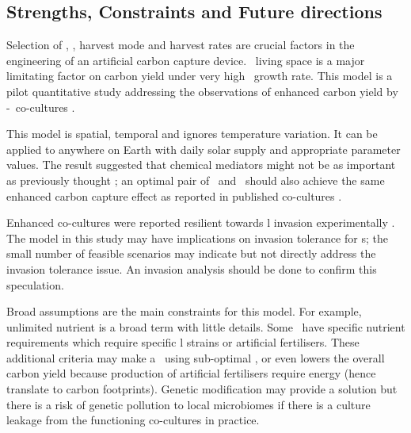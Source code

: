 \documentclass[../thesis.tex]{subfiles} %
\begin{document}
\subsection{Strengths, Constraints and Future directions}
Selection of \phy, \bac, harvest mode and harvest rates are crucial factors in the engineering of an artificial carbon capture device.  \Phy\ living space is a major limitating factor on carbon yield under very high \phy\ growth rate.  This model is a pilot quantitative study addressing the observations of enhanced carbon yield by \phy-\bac\ co-cultures \autocite{fuentes2016impact,santos2014microalgal}.

This model is spatial, temporal and ignores temperature variation.  It can be applied to anywhere on Earth with daily solar supply and appropriate parameter values.  The result suggested that chemical mediators might not be as important as previously thought \autocite{fuentes2016impact}; an optimal pair of \phy\ and \bac\ should also achieve the same enhanced carbon capture effect as reported in published co-cultures \autocite{amin2009photolysis,rivas2010interactions,seyedsayamdost2011roseobacticides}.

Enhanced co-cultures were reported resilient towards \bac l invasion experimentally \autocite{fuentes2016impact,seyedsayamdost2011roseobacticides}.  The model in this study may have implications on invasion tolerance for \pbs s; the small number of feasible scenarios may indicate but not directly address the invasion tolerance issue.  An invasion analysis should be done to confirm this speculation.

Broad assumptions are the main constraints for this model.  For example, unlimited nutrient is a broad term with little details.  Some \phy\ have specific nutrient requirements \autocite{kazamia2012mutualistic} which require specific \bac l strains or artificial fertilisers.  These additional criteria may make a \pbs\ using sub-optimal \bac, or even lowers the overall carbon yield because production of artificial fertilisers require energy (hence translate to carbon footprints).  Genetic modification may provide a solution but there is a risk of genetic pollution to local microbiomes if there is a culture leakage from the functioning co-cultures in practice.
\end{document}
